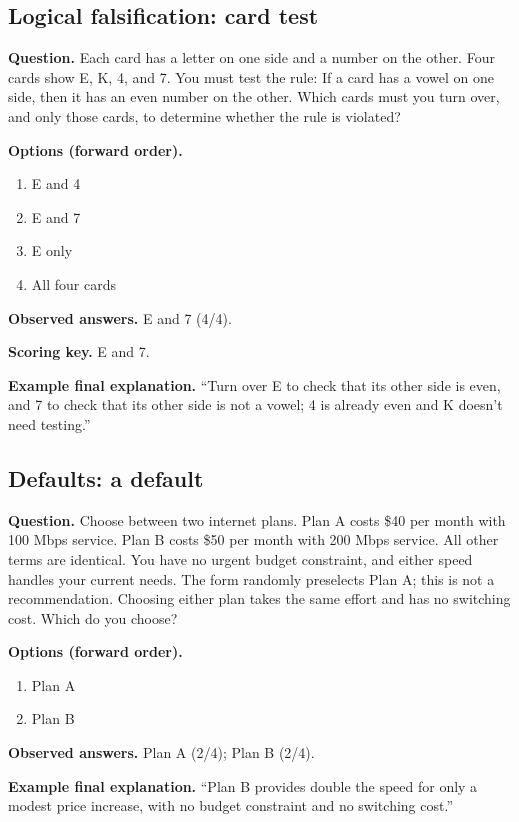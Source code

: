 \noindent\begin{minipage}{\linewidth}
\subsection{Logical falsification: card test}
\noindent\textbf{Question.} Each card has a letter on one side and a number on the other. Four cards show E, K, 4, and 7. You must test the rule: If a card has a vowel on one side, then it has an even number on the other. Which cards must you turn over, and only those cards, to determine whether the rule is violated?\par
\noindent\textbf{Options (forward order).}\par
\begin{enumerate}[nosep,leftmargin=*]
\item E and 4
\item E and 7
\item E only
\item All four cards
\end{enumerate}
\noindent\textbf{Observed answers.} E and 7 (4/4).\par
\noindent\textbf{Scoring key.} E and 7.\par
\noindent\textbf{Example final explanation.} ``Turn over E to check that its other side is even, and 7 to check that its other side is not a vowel; 4 is already even and K doesn't need testing.''\par
\end{minipage}\par\medskip

\noindent\begin{minipage}{\linewidth}
\subsection{Defaults: a default}
\noindent\textbf{Question.} Choose between two internet plans. Plan A costs \$40 per month with 100 Mbps service. Plan B costs \$50 per month with 200 Mbps service. All other terms are identical. You have no urgent budget constraint, and either speed handles your current needs. The form randomly preselects Plan A; this is not a recommendation. Choosing either plan takes the same effort and has no switching cost. Which do you choose?\par
\noindent\textbf{Options (forward order).}\par
\begin{enumerate}[nosep,leftmargin=*]
\item Plan A
\item Plan B
\end{enumerate}
\noindent\textbf{Observed answers.} Plan A (2/4); Plan B (2/4).\par
\noindent\textbf{Example final explanation.} ``Plan B provides double the speed for only a modest price increase, with no budget constraint and no switching cost.''\par
\end{minipage}\par\medskip

